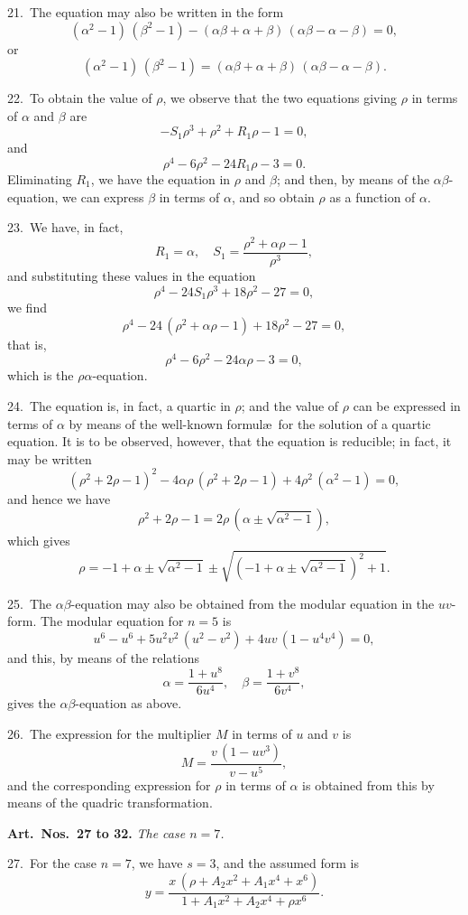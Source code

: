 \documentclass[12pt,a4paper]{article}
\theoremstyle{definition}
\begin{document}
21.\ The equation may also be written in the form
\[
(\alpha^2 - 1)\, (\beta^2 - 1) - (\alpha\beta + \alpha + \beta)\, (\alpha\beta - \alpha - \beta) = 0,
\]
or
\[
(\alpha^2 - 1)\, (\beta^2 - 1) = (\alpha\beta + \alpha + \beta)\, (\alpha\beta - \alpha - \beta).
\]

22.\ To obtain the value of $\rho$, we observe that the two equations giving $\rho$ in terms
of $\alpha$ and $\beta$ are
\[
-S_1 \rho^3 + \rho^2 + R_1 \rho - 1 = 0,
\]
and
\[
\rho^4 - 6\rho^2 - 24R_1 \rho - 3 = 0.
\]
Eliminating $R_1$, we have the equation in $\rho$ and $\beta$; and then, by means of the
$\alpha\beta$-equation, we can express $\beta$ in terms of $\alpha$, and so obtain $\rho$ as a function of $\alpha$.

23.\ We have, in fact,
\[
R_1 = \alpha, \quad S_1 = \frac{\rho^2 + \alpha\rho - 1}{\rho^3},
\]
and substituting these values in the equation
\[
\rho^4 - 24S_1 \rho^3 + 18\rho^2 - 27 = 0,
\]
we find
\[
\rho^4 - 24\, (\rho^2 + \alpha\rho - 1) + 18\rho^2 - 27 = 0,
\]
that is,
\[
\rho^4 - 6\rho^2 - 24\alpha\rho - 3 = 0,
\]
which is the $\rho\alpha$-equation.

24.\ The equation is, in fact, a quartic in $\rho$; and the value of $\rho$ can be expressed in
terms of $\alpha$ by means of the well-known formul\ae\ for the solution of a quartic equation.
It is to be observed, however, that the equation is reducible; in fact, it may be written
\[
(\rho^2 + 2\rho - 1)^2 - 4\alpha\rho\, (\rho^2 + 2\rho - 1) + 4\rho^2\, (\alpha^2 - 1) = 0,
\]
and hence we have
\[
\rho^2 + 2\rho - 1 = 2\rho\, (\alpha \pm \sqrt{\alpha^2 - 1}),
\]
which gives
\[
\rho = -1 + \alpha \pm \sqrt{\alpha^2 - 1} \pm \sqrt{(-1 + \alpha \pm \sqrt{\alpha^2 - 1})^2 + 1}.
\]

25.\ The $\alpha\beta$-equation may also be obtained from the modular equation in the $uv$-form.
The modular equation for $n = 5$ is
\[
u^6 - u^6 + 5u^2v^2\, (u^2 - v^2) + 4uv\, (1 - u^4v^4) = 0,
\]
and this, by means of the relations
\[
\alpha = \frac{1 + u^8}{6u^4}, \quad \beta = \frac{1 + v^8}{6v^4},
\]
gives the $\alpha\beta$-equation as above.

26.\ The expression for the multiplier $M$ in terms of $u$ and $v$ is
\[
M = \frac{v\, (1 - uv^3)}{v - u^5},
\]
and the corresponding expression for $\rho$ in terms of $\alpha$ is obtained from this by means
of the quadric transformation.

\newpage
\noindent\textbf{Art.\ Nos.\ 27 to 32.} \textit{The case $n = 7$.}

27.\ For the case $n = 7$, we have $s = 3$, and the assumed form is
\[
y = \frac{x\, (\rho + A_2 x^2 + A_1 x^4 + x^6)}{1 + A_1 x^2 + A_2 x^4 + \rho x^6}.
\]
\end{document}

